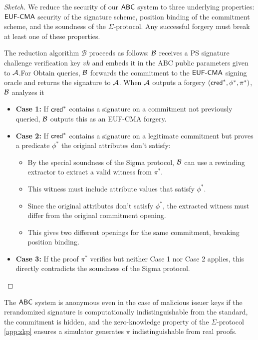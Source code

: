 \begin{proof}[Sketch]
We reduce the security of our $\mathsf{ABC}$ system to three underlying properties: $\mathsf{EUF\text{-}CMA}$ security of the signature scheme, position binding of the commitment scheme, and the soundness of the $\Sigma$-protocol. Any successful forgery must break at least one of these properties.

The reduction algorithm $\mathcal{B}$ proceeds as follows: $\mathcal{B}$ receives a PS signature challenge verification key $vk$ and embeds it in the ABC public parameters given to $\mathcal{A}$.For Obtain queries, $\mathcal{B}$ forwards the commitment to the $\mathsf{EUF\text{-}CMA}$ signing oracle and returns the signature to $\mathcal{A}$. When $\mathcal{A}$ outputs a forgery $(\mathsf{cred}^*, \phi^*, \pi^*)$, $\mathcal{B}$ analyzes it
\begin{itemize}
    \item \textbf{Case 1:} If $\mathsf{cred}^*$ contains a signature on a commitment not previously queried, $\mathcal{B}$ outputs this as an EUF-CMA forgery.

    \item \textbf{Case 2:} If $\mathsf{cred}^*$ contains a signature on a legitimate commitment but proves a predicate $\phi^*$ the original attributes don't satisfy:
        \begin{itemize}
        \item By the special soundness of the Sigma protocol, $\mathcal{B}$ can use a rewinding extractor to extract a valid witness from $\pi^*$.
        \item This witness must include attribute values that satisfy $\phi^*$.
        \item Since the original attributes don't satisfy $\phi^*$, the extracted witness must differ from the original commitment opening.
        \item This gives two different openings for the same commitment, breaking position binding.
    \end{itemize}

    \item \textbf{Case 3:} If the proof $\pi^*$ verifies but neither Case 1 nor Case 2 applies, this directly contradicts the soundness of the Sigma protocol.

\end{itemize}

\end{proof}



\begin{theorem}[Anonymity]
    The $\mathsf{ABC}$ system is anonymous even in the case of malicious issuer keys if the rerandomized signature is computationally indistinguishable from the standard, the commitment is hidden, and the zero-knowledge property of the $\Sigma$-protocol \ref{app:zkp} ensures a simulator generates $\pi$ indistinguishable from real proofs. 
\end{theorem}



